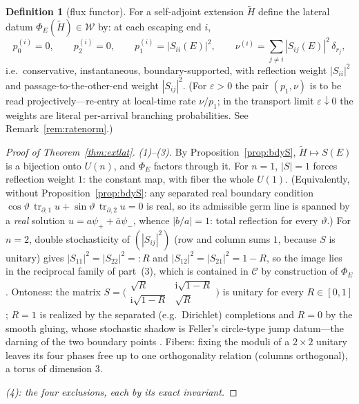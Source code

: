 \documentclass[11pt]{article}
\theoremstyle{definition}
\newtheorem{definition}[theorem]{Definition}
\theoremstyle{remark}
\newcommand{\ii}{\mathrm{i}}
\begin{document}
\begin{definition}[flux functor]\label{def:fluxfunctor}
For a self-adjoint extension $\tilde H$ define the lateral datum
$\Phi_{E}(\tilde H)\in\mathcal W$ by: at each escaping end $i$,
\[
p_{0}^{(i)}=0,\qquad p_{2}^{(i)}=0,\qquad
p_{1}^{(i)}=|S_{ii}(E)|^{2},\qquad
\nu^{(i)}=\sum_{j\ne i}|S_{ij}(E)|^{2}\,\delta_{r_{j}},
\]
i.e.\ conservative, instantaneous, boundary-supported, with reflection
weight $|S_{ii}|^{2}$ and passage-to-the-other-end weight
$|S_{ij}|^{2}$. (For $\varepsilon>0$ the pair $(p_{1},\nu)$ is to be
read projectively---re-entry at local-time rate $\nu/p_{1}$; in the
transport limit $\varepsilon\downarrow0$ the weights are literal
per-arrival branching probabilities. See Remark~\ref{rem:ratenorm}.)
\end{definition}

\begin{proof}[Proof of Theorem~\ref{thm:extlat}]
\emph{(1)--(3).} By Proposition~\ref{prop:bdyS},
$\tilde H\mapsto S(E)$ is a bijection onto $U(n)$, and $\Phi_{E}$
factors through it. For $n=1$, $|S|=1$ forces reflection weight $1$:
the constant map, with fiber the whole $U(1)$. (Equivalently, without
Proposition~\ref{prop:bdyS}: any separated real boundary condition
$\cos\vartheta\,\operatorname{tr}_{\partial,1}u+\sin\vartheta\,\operatorname{tr}_{\partial,2}u=0$ is real, so its
admissible germ line is spanned by a \emph{real} solution
$u=a\psi_{+}+\bar a\psi_{-}$, whence $|b/a|=1$: total reflection for
every $\vartheta$.) For $n=2$, double stochasticity of $(|S_{ij}|^{2})$
(row and column sums $1$, because $S$ is unitary) gives
$|S_{11}|^{2}=|S_{22}|^{2}=:R$ and $|S_{12}|^{2}=|S_{21}|^{2}=1-R$, so
the image lies in the reciprocal family of part~(3), which is contained
in $\mathcal C$ by construction of $\Phi_{E}$. Ontoness: the matrix
$S=\bigl(\begin{smallmatrix}\sqrt R&\ii\sqrt{1-R}\\
\ii\sqrt{1-R}&\sqrt R\end{smallmatrix}\bigr)$ is unitary for every
$R\in[0,1]$; $R=1$ is realized by the separated (e.g.\ Dirichlet)
completions and $R=0$ by the smooth gluing, whose stochastic shadow is
Feller's circle-type jump datum---the darning of the two boundary
points \cite{ChenFukushima}. Fibers: fixing the moduli of a $2\times2$
unitary leaves its four phases free up to one orthogonality relation
(columns orthogonal), a torus of dimension $3$.

\emph{(4): the four exclusions, each by its exact invariant.}


\end{proof}
\end{document}
